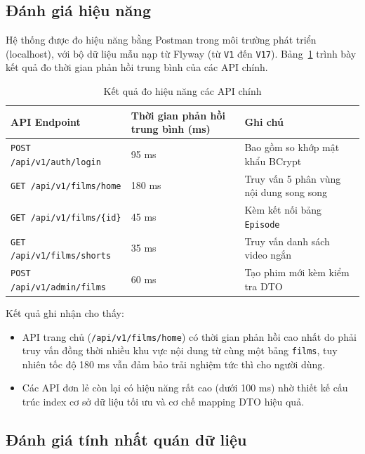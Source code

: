 \subsection{Đánh giá hiệu năng}
\label{subsec:danh_gia_hieu_nang}

Hệ thống được đo hiệu năng bằng Postman trong môi trường phát triển (localhost), với bộ dữ liệu mẫu nạp từ Flyway (từ \texttt{V1} đến \texttt{V17}). Bảng~\ref{tab:perf} trình bày kết quả đo thời gian phản hồi trung bình của các API chính.

\begin{table}[H]
\centering
\caption{Kết quả đo hiệu năng các API chính}
\label{tab:perf}
\renewcommand{\arraystretch}{1.3}
\begin{tabularx}{\textwidth}{|l|X|X|}
\hline
\textbf{API Endpoint} & \textbf{Thời gian phản hồi trung bình (ms)} & \textbf{Ghi chú} \\
\hline
\texttt{POST /api/v1/auth/login} & 95 ms & Bao gồm so khớp mật khẩu BCrypt \\
\hline
\texttt{GET /api/v1/films/home} & 180 ms & Truy vấn 5 phân vùng nội dung song song \\
\hline
\texttt{GET /api/v1/films/\{id\}} & 45 ms & Kèm kết nối bảng \texttt{Episode} \\
\hline
\texttt{GET /api/v1/films/shorts} & 35 ms & Truy vấn danh sách video ngắn \\
\hline
\texttt{POST /api/v1/admin/films} & 60 ms & Tạo phim mới kèm kiểm tra DTO \\
\hline
\end{tabularx}
\end{table}

\noindent Kết quả ghi nhận cho thấy:
\begin{itemize}
    \item API trang chủ (\texttt{/api/v1/films/home}) có thời gian phản hồi cao nhất do phải truy vấn đồng thời nhiều khu vực nội dung từ cùng một bảng \texttt{films}, tuy nhiên tốc độ 180 ms vẫn đảm bảo trải nghiệm tức thì cho người dùng.
    \item Các API đơn lẻ còn lại có hiệu năng rất cao (dưới 100 ms) nhờ thiết kế cấu trúc index cơ sở dữ liệu tối ưu và cơ chế mapping DTO hiệu quả.
\end{itemize}

\subsection{Đánh giá tính nhất quán dữ liệu}
\label{subsec:danh_gia_nhat_quan}


